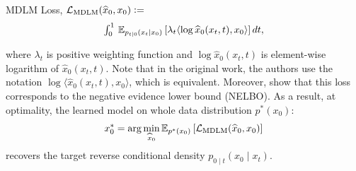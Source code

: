   \begin{Box1}{MDLM Loss, $\mathcal{L}_{\text{MDLM}}(\widehat{x}_0, x_0) \vcentcolon=$}
    \vspace{-8pt}
    \begin{gather}
      \textstyle \int_0^1 \, \mathbb{E}_{p_{t|0}(x_t \mid x_0)} \left[
          \lambda_{t} \langle \log\widehat{x}_0(x_t, t), x_0 \rangle
      \right]dt,
    \label{eq:mdlm loss}
    \end{gather}
  \end{Box1}
  where $\lambda_{t}$ is positive weighting function and $\log \widehat{x}_0(x_t, t)$ is element-wise logarithm of $\widehat{x}_0(x_t, t)$. Note that in the original work, the authors use the notation $\log \langle \widehat{x}_0(x_t, t), x_0 \rangle$, which is equivalent. Moreover, \citep{sahoo2024simple} show that this loss corresponds to the negative evidence lower bound (NELBO). As a result, at optimality, the learned model on whole data distribution $p^*(x_0)$: 
  \[
    x_0^* = \arg\min_{\widehat{x}_0} \mathbb{E}_{p^*(x_0)}\left[\mathcal{L}_{\text{MDLM}}(\widehat{x}_0, x_0)\right]
  \]
  recovers the target reverse conditional density $p_{0\mid t}(x_0 \mid x_t).$


